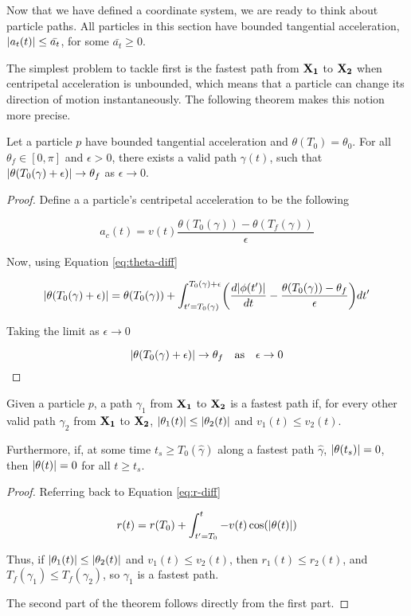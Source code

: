 Now that we have defined a coordinate system, we are ready to think about particle paths. All particles in this section have bounded tangential acceleration, $\abs{a_t(t)} \le \bar{a_t}$, for some $\bar{a_t} \ge 0$.

The simplest problem to tackle first is the fastest path from $\mathbf{X_1}$ to $\mathbf{X_2}$ when centripetal acceleration is unbounded, which means that a particle can change its direction of motion instantaneously. The following theorem makes this notion more precise.

\begin{theorem}
  Let a particle $p$ have bounded tangential acceleration and $\theta(T_0) = \theta_0$. For all $\theta_f \in [0, \pi]$ and $\epsilon > 0$, there exists a valid path $\gamma(t)$, such that $\abs{\theta(T_0(\gamma) + \epsilon)} \to \theta_f$ as $\epsilon \to 0$.
\end{theorem}
  
\begin{proof}
  Define a a particle's centripetal acceleration to be the following

  \[
      a_c(t) = v(t) \frac{\theta(T_0(\gamma)) - \theta(T_f(\gamma))}{\epsilon}
  \]

  Now, using Equation \ref{eq:theta-diff}

  \[
    \abs{\theta(T_0(\gamma) + \epsilon)} = \theta(T_0(\gamma)) + \int_{t'=T_0(\gamma)}^{T_0(\gamma)+\epsilon} \paren{\frac{d\abs{\phi(t')}}{dt} - \frac{\theta(T_0(\gamma)) - \theta_f}{\epsilon}} dt'
  \]

  Taking the limit as $\epsilon \to 0$

  \[
    \abs{\theta(T_0(\gamma) + \epsilon)} \to \theta_f \quad \text{as} \quad \epsilon \to 0
  \]
\end{proof}

\begin{theorem}\label{thm:theta-zero}
  Given a particle $p$, a path $\gamma_1$ from $\mathbf{X_1}$ to $\mathbf{X_2}$ is a fastest path if, for every other valid path $\gamma_2$ from $\mathbf{X_1}$ to $\mathbf{X_2}$, $\abs{\theta_1(t)} \le \abs{\theta_2(t)}$ and $v_1(t) \le v_2(t)$.

  Furthermore, if, at some time $t_s \ge T_0(\hat{\gamma})$ along a fastest path $\hat{\gamma}$, $\abs{\theta(t_s)} = 0$, then $\abs{\theta(t)} = 0$ for all $t \ge t_s$. 
\end{theorem}

\begin{proof}
  Referring back to Equation \ref{eq:r-diff}

  \[r(t) = r(T_0) + \int_{t' = T_0}^{t} - v(t) \cos(\abs{\theta(t)})\]

  Thus, if $\abs{\theta_1(t)} \le \abs{\theta_2(t)}$ and $v_1(t) \le v_2(t)$, then $r_1(t) \le r_2(t)$, and $T_f(\gamma_1) \le T_f(\gamma_2)$, so $\gamma_1$ is a fastest path.

  The second part of the theorem follows directly from the first part.
\end{proof}

